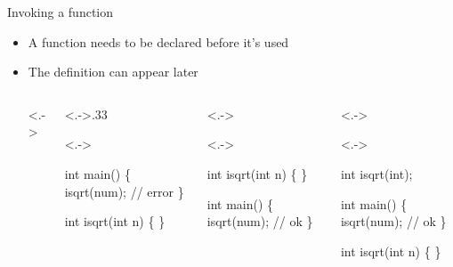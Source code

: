 \begin{frame}[fragile]{Invoking a function \insertcontinuationtext}

  \begin{itemize}
  \item A function needs to be declared before it’s used
  \item The definition can appear later

    \begin{columns}[T]<.->
      \begin{column}<.->{.33\textwidth}
        \begin{codeblock}<.->{
int main()
\{
  \ddd
  isqrt(num); // error
  \ddd
\}

int isqrt(int n)
\{
   \ddd
\}}\end{codeblock}
      \end{column}
      \begin{column}{.33\textwidth}<.->
        \begin{codeblock}<.->{
int isqrt(int n)
\{
  \ddd
\}

int main()
\{
  \ddd
  isqrt(num); // ok
  \ddd
\}}\end{codeblock}
      \end{column}
      \begin{column}{.33\textwidth}<.->
        \begin{codeblock}<.->{
int isqrt(int);

int main()
\{
  \ddd
  isqrt(num); // ok
  \ddd
\}

int isqrt(int n)
\{
  \ddd
\}}\end{codeblock}
      \end{column}
    \end{columns}

  \end{itemize}

\end{frame}

